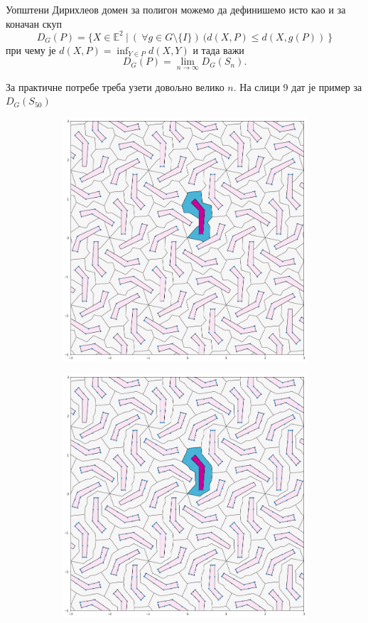 \documentclass[12pt]{article}
\begin{document}
Уопштени Дирихлеов домен за полигон можемо да дефинишемо исто као и за коначан скуп
$$D_G(P) = \{X \in \mathbb{E}^2\:|\:(\:\forall g \in G \setminus \{I\})\:(d(X,P)\leq d(X,g(P))\:\}$$
при чему је $d(X,P) = \inf_{Y \in P} d(X,Y)$  и тада важи
$$ D_G(P) = \lim _{n\to \infty} D_G(S_n). $$


За практичне потребе треба узети довољно велико $n$. На слици 9 дат је пример за $D_G(S_{50})$

  \begin{figure}[H]
  \begin{subfigure}[b]{0.32\textwidth}
    \includegraphics[width=.9\textwidth]{poligon1.png}
    \label{fig:f7}
  \end{subfigure}
  \begin{subfigure}[b]{0.32\textwidth}
    \includegraphics[width=.9\textwidth]{poligon2.png}

\end{subfigure}
\end{figure}
\end{document}
